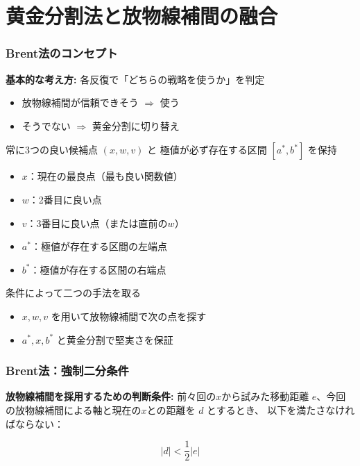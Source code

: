 \section{黄金分割法と放物線補間の融合}

\begin{frame}
 \frametitle{Brent法のコンセプト}
 
 \textbf{基本的な考え方:}
  各反復で「どちらの戦略を使うか」を判定
  \begin{itemize}
   \item 放物線補間が信頼できそう $\Rightarrow$ 使う
   \item そうでない $\Rightarrow$ 黄金分割に切り替え
 \end{itemize}
\end{frame}
\begin{frame}
  常に3つの良い候補点 $(x, w, v)$ と 極値が必ず存在する区間 $[a^*, b^*]$ を保持
  \begin{itemize}
   \item $x$：現在の最良点（最も良い関数値）
   \item $w$：2番目に良い点
   \item $v$：3番目に良い点（または直前の$w$）
   \item $a^*$：極値が存在する区間の左端点 
   \item $b^*$：極値が存在する区間の右端点
  \end{itemize}
  
  条件によって二つの手法を取る
  \begin{itemize}
   \item  $x,w,v$ を用いて放物線補間で次の点を探す
   \item  $a^*,x ,b^*$ と黄金分割で堅実さを保証
  \end{itemize}
\end{frame}

\begin{frame}
 \frametitle{Brent法：強制二分条件}

 \textbf{放物線補間を採用するための判断条件:}
 前々回の$x$から試みた移動距離 $e$、今回の放物線補間による軸と現在の$x$との距離を $d$ とするとき、
 以下を満たさなければならない：
 
 \begin{tcolorbox}[colback=red!10!white, colframe=red!75!black, title=強制二分条件]
  \begin{equation*}
   |d| < \frac{1}{2}|e|
  \end{equation*}
 \end{tcolorbox}
\end{frame}

